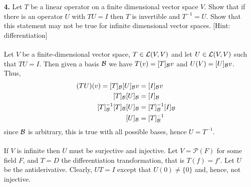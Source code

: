 \documentclass[11pt]{amsart}
\theoremstyle{definition}  %
\begin{document}
\newpage
\vskip 0.1cm
\noindent 
{\bf 4.} Let $T$ be a linear operator on a finite dimensional vector space $V$. Show that if  there is an operator $U$ with $TU = I$ then 
$T$ is invertible and $T^{-1} = U$. Show that this statement may not be true for infinite dimensional vector spaces. [Hint: differentiation] \\ 
\\
Let $V$ be a finite-dimensional vector space, $T \in \mathcal{L}(V,V)$ and let $U \in \mathcal{L}(V,V)$ such that $TU=I$.  Then given a basis $\mathcal{B}$ we have $T(v)=[T]_{\mathcal{B}} v$ and $U(V)=[U]_{\mathcal{B}} v$.  Thus,
\begin{align*}
	(TU)(v)=[T]_{\mathcal{B}} [U]_{\mathcal{B}} v &= [I]_{\mathcal{B}} v\\
	[T]_{\mathcal{B}} [U]_{\mathcal{B}} &= [I]_{\mathcal{B}} \\
	[T]_{\mathcal{B}}^{-1}[T]_{\mathcal{B}} [U]_{\mathcal{B}} &= [T]_{\mathcal{B}}^{-1}[I]_{\mathcal{B}}\\
	[U]_{\mathcal{B}} &= [T]_{\mathcal{B}}^{-1}
\end{align*}since $\mathcal{B}$ is arbitrary, this is true with all possible bases, hence $U= T^{-1}$.\\
\\
If $V$ is infinite then $U$ must be surjective and injective.  Let $V = \mathcal{P}(F)$ for some field $F$, and $T=D$ the differentiation transformation, that is $T(f)=f'$.  Let $U$ be the antiderivative.  Clearly, $UT=I$ except that $U(0) \ne \{0\}$ and, hence, not injective.
\\
\end{document}
